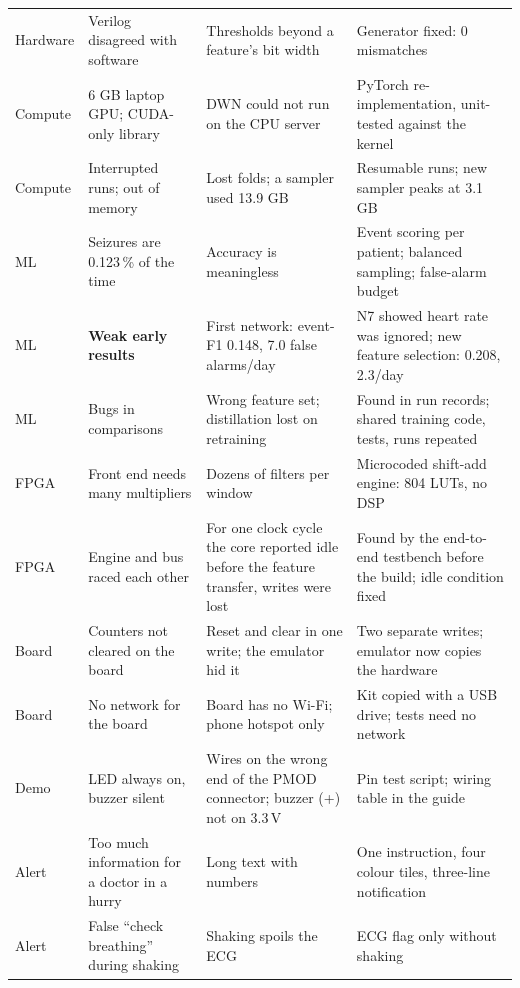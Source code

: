 \begin{xltabular}{\textwidth}{@{}P{17mm}P{40mm}LL@{}}
\small Hardware & \small Verilog disagreed with software & \small Thresholds beyond a feature's bit width & \small
Generator fixed: 0 mismatches\\
\small Compute & \small 6 GB laptop GPU; CUDA-only library & \small DWN could not run on the CPU server & \small
PyTorch re-implementation, unit-tested against the kernel\\
\small Compute & \small Interrupted runs; out of memory & \small Lost folds; a sampler used 13.9 GB & \small Resumable
runs; new sampler peaks at 3.1 GB\\
\small ML & \small Seizures are 0.123\,\% of the time & \small Accuracy is meaningless & \small Event scoring per
patient; balanced sampling; false-alarm budget\\
\small ML & \small \textbf{Weak early results} & \small First network: event-F1 0.148, 7.0 false alarms/day & \small
N7 showed heart rate was ignored; new feature selection: 0.208, 2.3/day\\
\small ML & \small Bugs in comparisons & \small Wrong feature set; distillation lost on retraining & \small Found in
run records; shared training code, tests, runs repeated\\
\small FPGA & \small Front end needs many multipliers & \small Dozens of filters per window & \small Microcoded
shift-add engine: 804 LUTs, no DSP\\
\small FPGA & \small Engine and bus raced each other & \small For one clock cycle the core reported idle before the
feature transfer, writes were lost & \small Found by the end-to-end testbench before the build; idle condition fixed\\
\small Board & \small Counters not cleared on the board & \small Reset and clear in one write; the emulator hid it &
\small Two separate writes; emulator now copies the hardware\\
\small Board & \small No network for the board & \small Board has no Wi-Fi; phone hotspot only & \small Kit copied with
a USB drive; tests need no network\\
\small Demo & \small LED always on, buzzer silent & \small Wires on the wrong end of the PMOD connector; buzzer (+) not
on 3.3\,V & \small Pin test script; wiring table in the guide\\
\small Alert & \small Too much information for a doctor in a hurry & \small Long text with numbers & \small One
instruction, four colour tiles, three-line notification\\
\small Alert & \small False ``check breathing'' during shaking & \small Shaking spoils the ECG & \small ECG flag only
without shaking\\
\end{xltabular}

